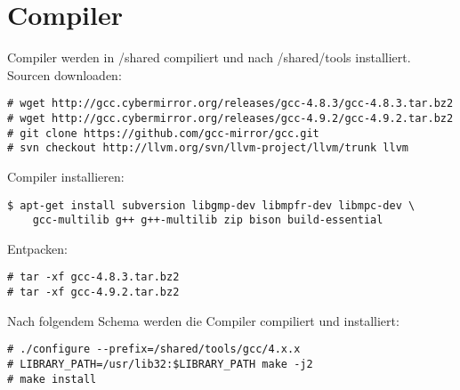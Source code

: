 \chapter{Compiler}
Compiler werden in /shared compiliert und nach /shared/tools installiert.
Sourcen downloaden:
\begin{lstlisting}[style=Bash]
# wget http://gcc.cybermirror.org/releases/gcc-4.8.3/gcc-4.8.3.tar.bz2
# wget http://gcc.cybermirror.org/releases/gcc-4.9.2/gcc-4.9.2.tar.bz2
# git clone https://github.com/gcc-mirror/gcc.git
# svn checkout http://llvm.org/svn/llvm-project/llvm/trunk llvm
\end{lstlisting}
Compiler installieren:
\begin{lstlisting}[style=Bash]
$ apt-get install subversion libgmp-dev libmpfr-dev libmpc-dev \
	gcc-multilib g++ g++-multilib zip bison build-essential
\end{lstlisting}
Entpacken:
\begin{lstlisting}[style=Bash]
# tar -xf gcc-4.8.3.tar.bz2
# tar -xf gcc-4.9.2.tar.bz2
\end{lstlisting}
Nach folgendem Schema werden die Compiler compiliert und installiert:
\begin{lstlisting}[style=Bash]
# ./configure --prefix=/shared/tools/gcc/4.x.x
# LIBRARY_PATH=/usr/lib32:$LIBRARY_PATH make -j2
# make install
\end{lstlisting}
